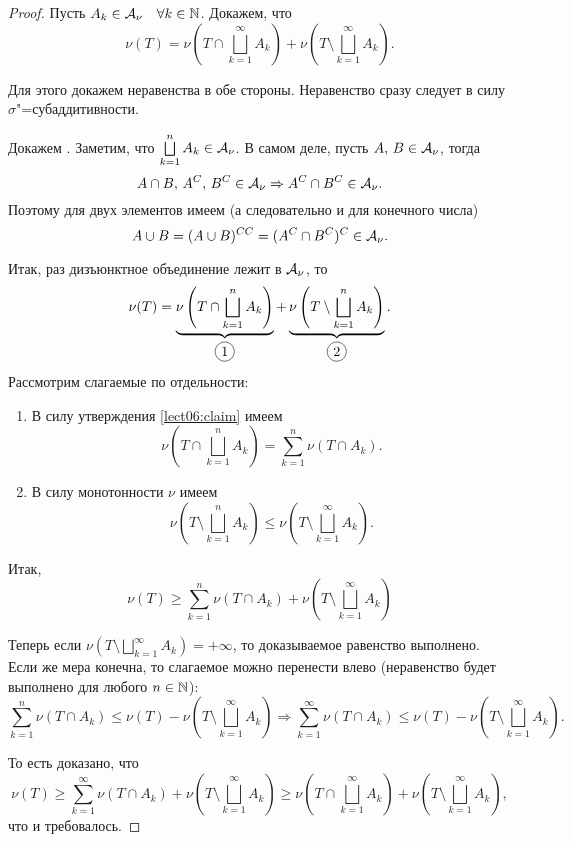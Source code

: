 \begin{theorem}[Каратеодори]
\begin{proof}
        \circled{$\mathbf{\lambda}$} Пусть $A_k\in\mathcal{A}_{\nu}\quad\forall k\in\mathbb{N}$. Докажем, что
        \[
            \nu(T)=\nu\left(T\cap\bigsqcup_{k=1}^{\infty}A_k\right)+\nu\left(T\setminus\bigsqcup_{k=1}^{\infty}A_k\right).
        \]

        Для этого докажем неравенства в обе стороны. Неравенство \circled{$\leqslant$} сразу следует в силу $\sigma$"=субаддитивности.

        Докажем \circled{$\geqslant$}. Заметим, что $\bigsqcup\limits_{k=1}^{n}A_k\in\mathcal{A}_{\nu}$. В самом деле, пусть $A,\, B\in\mathcal{A}_{\nu}$, тогда
        \[A\cap B,\, A^C,\, B^C\in\mathcal{A}_{\nu}\Rightarrow A^C\cap B^C\in\mathcal{A}_{\nu}.\] Поэтому для двух элементов имеем (а следовательно и для конечного числа)
        \[
            A\cup B=(A\cup B)^{CC}=(A^C\cap B^C)^C\in\mathcal{A}_{\nu}.
        \]

        Итак, раз дизъюнктное объединение лежит в $\mathcal{A}_{\nu}$, то
        \[
            \nu(T)=\underbrace{\nu\left(T\cap\bigsqcup_{k=1}^{n}A_k\right)}_{\circled{1}}+
            \underbrace{\nu\left(T\setminus\bigsqcup_{k=1}^{n}A_k\right)}_{\circled{2}}.
        \]
        Рассмотрим слагаемые по отдельности:
        \begin{enumerate}[label=\protect\circled{\arabic*}]
            \item В силу утверждения \ref{lect06:claim} имеем \[
                      \nu\left(T\cap\bigsqcup_{k=1}^{n}A_k\right)=\sum_{k=1}^{n}\nu(T\cap A_k).
                  \]
            \item В силу монотонности $\nu$ имеем \[
                      \nu\left(T\setminus\bigsqcup_{k=1}^{n}A_k\right)\leqslant\nu\left(T\setminus\bigsqcup_{k=1}^{\infty}A_k\right).
                  \]
        \end{enumerate}

        Итак,
        \[\nu(T)\geqslant\sum_{k=1}^{n}\nu(T\cap A_k)+\nu\left(T\setminus\bigsqcup_{k=1}^{\infty}A_k\right)\]

        Теперь если $\nu\left(T\setminus\bigsqcup\limits_{k=1}^{\infty}A_k\right)=+\infty$, то доказываемое равенство выполнено.
        Если же мера конечна, то слагаемое можно перенести влево (неравенство будет выполнено для любого $n\in\mathbb{N}$):
        \[
            \sum_{k=1}^{n}\nu(T\cap A_k)\leqslant\nu(T)-\nu\left(T\setminus\bigsqcup_{k=1}^{\infty}A_k\right)\Rightarrow
            \sum_{k=1}^{\infty}\nu(T\cap A_k)\leqslant\nu(T)-\nu\left(T\setminus\bigsqcup_{k=1}^{\infty}A_k\right).
        \]

        То есть доказано, что
        \[
            \nu(T)\geqslant\sum_{k=1}^{\infty}\nu(T\cap A_k)+\nu\left(T\setminus\bigsqcup_{k=1}^{\infty}A_k\right)\geqslant
            \nu\left(T\cap\bigsqcup_{k=1}^{\infty}A_k\right)+\nu\left(T\setminus\bigsqcup_{k=1}^{\infty}A_k\right),
        \]
        что и требовалось.

    \end{proof}
\end{theorem}


